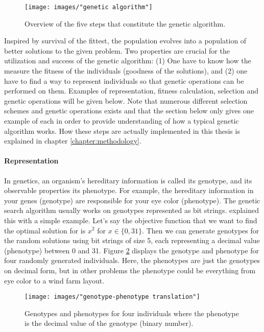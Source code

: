 \begin{figure}[h!]
\begin{center}
\texttt{[image: images/"genetic algorithm"]}
\caption{Overview of the five steps that constitute the genetic algorithm.}
\label{GA}
\end{center}
\end{figure}


\noindent Inspired by survival of the fittest, the population evolves into a population of better solutions to the given problem. Two properties are crucial for the utilization and success of the genetic algorithm: (1) One have to know how the measure the fitness of the individuals (goodness of the solutions), and (2) one have to find a way to represent individuals so that genetic operations can be performed on them. Examples of representation, fitness calculation, selection and genetic operations will be given below. Note that numerous different selection schemes and genetic operations exists and that the section below only gives one example of each in order to provide understanding of how a typical genetic algorithm works. How these steps are actually implemented in this thesis is explained in chapter \ref{chapter:methodology}. \\ 


\paragraph*{Representation}
In genetics, an organism's hereditary information is called its genotype, and its observable properties its phenotype. For example, the hereditary information in your genes (genotype) are responsible for your eye color (phenotype). The genetic search algorithm usually works on genotypes represented as bit strings. \cite{Goldberg} explained this with a simple example. Let's say the objective function that we want to find the optimal solution for is $x^2$ for $x \in \{0, 31\}$. Then we can generate genotypes for the random solutions using bit strings of size 5, each representing a decimal value (phenotype) between 0 and 31. Figure \ref{Representation} displays the genotype and phenotype for four randomly generated individuals. Here, the phenotypes are just the genotypes on decimal form, but in other problems the phenotype could be everything from eye color to a wind farm layout.


\begin{figure}[h!]
\begin{center}
\texttt{[image: images/"genotype-phenotype translation"]}
\caption{Genotypes and phenotypes for four individuals where the phenotype is the decimal value of the genotype (binary number).}
\label{Representation}
\end{center}
\end{figure}


